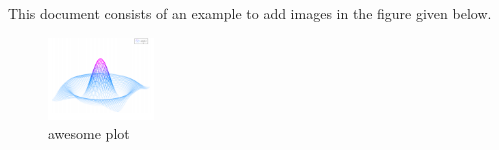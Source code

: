 \documentclass{article}
\begin{document}
This document consists of an example to add images in the figure given below.

\begin{figure}[h]
\centering
\includegraphics[width=0.25\textwidth]{mesh}
\caption{awesome plot}
\label{fig:mesh1}
\end{figure}
\end{document}
